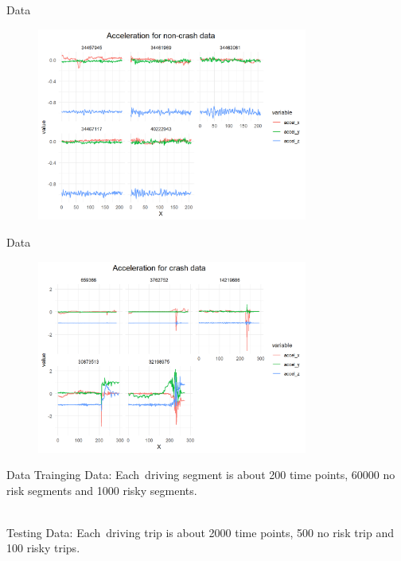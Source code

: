 \documentclass{beamer}
\begin{document}
{    \begin{frame}{Data}
   		\begin{figure}[htbp]
   			\centering
   			\includegraphics[width=3.5in]{figs/non_seg}
   			\label{fig_non_seg}
   		\end{figure}      
   \end{frame}
   
   \begin{frame}{Data}
   	\begin{figure}[htbp]
   		\centering
   		\includegraphics[width=3.5in]{figs/crash_seg}
   		\label{fig_crash_seg}
   	\end{figure}      
   \end{frame}

  \begin{frame}{Data}
  \alert{Trainging Data}: Each driving segment is about 200 time points, 60000 no risk segments and 1000 risky segments.
  
  ~\\
  \alert{Testing Data}:
  Each driving trip is about 2000 time points, 500 no risk trip and 100 risky trips.
     
  \end{frame}

}
\end{document}
